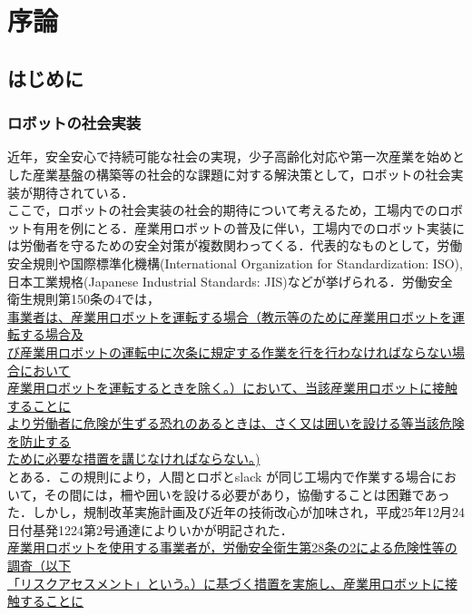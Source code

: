 \chapter{序論}
\section{はじめに}
\subsection{ロボットの社会実装}%
近年，安全安心で持続可能な社会の実現，少子高齢化対応や第一次産業を始めとした産業基盤の構築等の社会的な課題に対する解決策として，ロボットの社会実装が期待されている．\\
ここで，ロボットの社会実装の社会的期待について考えるため，工場内でのロボット有用を例にとる．産業用ロボットの普及に伴い，工場内でのロボット実装には労働者を守るための安全対策が複数関わってくる．代表的なものとして，労働安全規則や国際標準化機構(International Organization for Standardization: ISO), 日本工業規格(Japanese Industrial Standards: JIS)などが挙げられる．労働安全衛生規則第150条の4では，\\
 \underline{事業者は、産業用ロボットを運転する場合（教示等のために産業用ロボットを運転する場合及}\\
 \underline{び産業用ロボットの運転中に次条に規定する作業を行を行わなければならない場合において}\\
 \underline{産業用ロボットを運転するときを除く。）において、当該産業用ロボットに接触することに}\\
 \underline{より労働者に危険が生ずる恐れのあるときは、さく又は囲いを設ける等当該危険を防止する}\\
 \underline{ために必要な措置を講じなければならない。)}\\
  とある．この規則により，人間とロボとslack が同じ工場内で作業する場合において，その間には，柵や囲いを設ける必要があり，協働することは困難であった．しかし，規制改革実施計画及び近年の技術改心が加味され，平成25年12月24日付基発1224第2号通達によりいかが明記された．\\
   \underline{産業用ロボットを使用する事業者が，労働安全衛生第28条の2による危険性等の調査（以下}\\
 \underline{「リスクアセスメント」という。）に基づく措置を実施し、産業用ロボットに接触することに}\\
